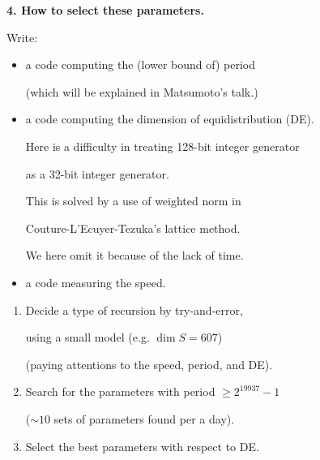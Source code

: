 \documentclass[a4j,12pt,landscape]{jarticle}
\begin{document}
\newpage
{\bf 4. How to select these parameters.}

Write: 
\begin{itemize}
\item a code computing the (lower bound of) period

(which will be explained in Matsumoto's talk.)
\item  a code computing the dimension of equidistribution (DE).

Here is a difficulty in treating 128-bit integer generator 

as a 32-bit integer generator.

This is solved by a use of weighted norm in 

Couture-L'Ecuyer-Tezuka's lattice method.
 
We here omit it 
because of the lack of time.
%

\item a code measuring the speed.
\end{itemize}

\newpage
\begin{enumerate}
\item 
Decide a type of recursion by try-and-error,

using a small model (e.g. $\dim S = 607$)

(paying attentions to the speed, period, and DE).
\item
Search for the parameters 
with period $\geq 2^{19937}-1$ 

($\sim 10$ sets of parameters found per a day).
\item
Select the best parameters with respect to DE.
\end{enumerate}
\end{document}
